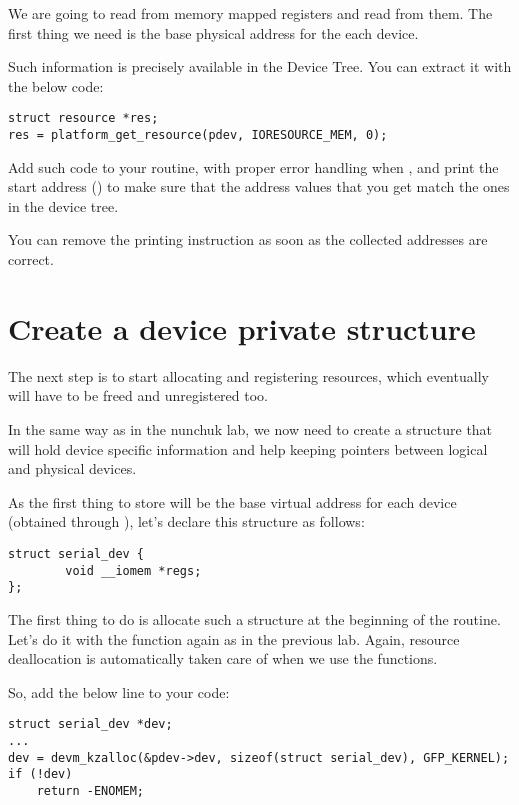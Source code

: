 We are going to read from memory mapped registers and read from them.
The first thing we need is the base physical address for the each
device.

Such information is precisely available in the Device Tree. You can
extract it with the below code:

\begin{verbatim}
struct resource *res;
res = platform_get_resource(pdev, IORESOURCE_MEM, 0);
\end{verbatim}

Add such code to your  routine, with proper error
handling when , and print the start address
() to make sure that the address values that
you get match the ones in the device tree.

You can remove the printing instruction as soon as the collected
addresses are correct.

\section{Create a device private structure}

The next step is to start allocating and registering resources,
which eventually will have to be freed and unregistered too.

In the same way as in the nunchuk lab, we now need to create a
structure that will hold device specific information and help
keeping pointers between logical and physical devices.

As the first thing to store will be the base virtual address for
each device (obtained through ), let's declare this
structure as follows:

\begin{verbatim}
struct serial_dev {
        void __iomem *regs;
};
\end{verbatim}

The first thing to do is allocate such a structure at the beginning
of the  routine. Let's do it with the 
function again as in the previous lab. Again, resource deallocation is
automatically taken care of when we use the  functions.

So, add the below line to your code:

\begin{verbatim}
struct serial_dev *dev;
...
dev = devm_kzalloc(&pdev->dev, sizeof(struct serial_dev), GFP_KERNEL);
if (!dev)
	return -ENOMEM;
\end{verbatim}

